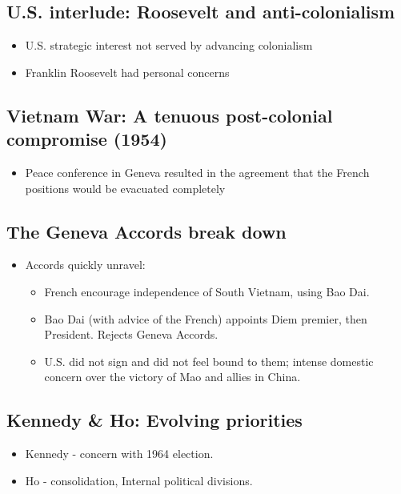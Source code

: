 \documentclass{article}
\begin{document}
\subsection{U.S. interlude: Roosevelt and anti-colonialism}
\begin{itemize}
  \item U.S. strategic interest not served by advancing colonialism
  \item Franklin Roosevelt had personal concerns
\end{itemize}


\subsection{Vietnam War: A tenuous post-colonial compromise (1954)}
\begin{itemize}
  \item Peace conference in Geneva resulted in the agreement that the French positions would be evacuated completely
\end{itemize}

\subsection{The Geneva Accords break down}
\begin{itemize}
  \item Accords quickly unravel:
    \begin{itemize}
      \item French encourage independence of South Vietnam, using Bao Dai.
      \item Bao Dai (with advice of the French) appoints Diem premier, then President.  Rejects Geneva Accords.
      \item U.S. did not sign and did not feel bound to them; intense domestic concern over the victory of Mao and allies in China.
    \end{itemize}
\end{itemize}

\subsection{Kennedy \& Ho: Evolving priorities}
\begin{itemize}
  \item Kennedy - concern with 1964 election.
  \item Ho - consolidation, Internal political divisions.
\end{itemize}
\end{document}
